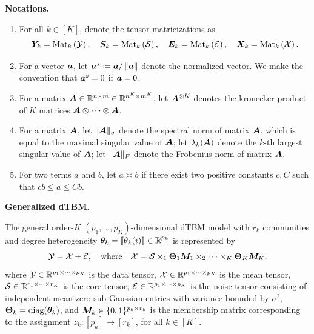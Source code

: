 \documentclass[lettersize,onecolumn,journal]{IEEEtran}
\theoremstyle{definition}
\theoremstyle{definition}
\newcommand{\of}[1]{\left(#1\right)}
\begin{document}
{\bf Notations.}
\begin{enumerate}
    \item For all $ k \in [K]$, denote the tensor matricizations as
    \begin{equation}
        \mY_k = \mat_k \of{ \tY }, \quad \mS_k = \mat_k \of{\tS}, \quad \mE_k = \mat_k \of{ \tE}, \quad \mX_k = \mat_k \of{\tX}.
    \end{equation}
    \item For a vector $\bm{a}$, let $\bm{a}^{s} \coloneqq \bm{a}/\left\lVert\bm{a}\right\rVert$ denote the normalized vector. We make the convention that $\bm{a}^s = 0$ if $\bm{a} = 0$. 
    \item For a matrix $\bm A \in \mathbb{R}^{n \times m} \in \mathbb{R}^{n^K \times m^K}$, let $\bm A^{\otimes K}$ denotes the kronecker product of $K$ matrices $\bm A \otimes \cdots \otimes \bm A$,
    \item For a matrix $\bm A$, let $\lVert\bm A\rVert_\sigma$ denote the spectral norm of matrix $\bm A$, which is equal to the maximal singular value of $\bm A$; let $\lambda_k(\bm A)$ denote the $k$-th largest singular value of $\bm A$; let $\lVert\bm A\rVert_F$ denote the Frobenius norm of matrix $\bm A$.
    \item For two terms $a$ and $b$, let $a \asymp b$ if there exist two positive constants $c, C$ such that $cb \leq a\leq Cb$. 
\end{enumerate}


{\bf Generalized dTBM.} 
 
 The general order-$K$ $(p_1, \ldots, p_K)$-dimensional dTBM model with $r_k$ communities and degree heterogeneity $\boldsymbol{\theta}_k = \llbracket \theta_k(i) \rrbracket \in \mathbb{R}_+^{p_k}$ is represented by
\begin{equation}\label{eq:general_dtbm}
    \tY = \tX+ \tE,\quad \text{where}\quad \tX=\tS \times_1 \mTheta_1 \mM_1 \times_2 \cdots \times_K \mTheta_K \mM_K,
\end{equation}
where $\mathcal{Y} \in \mathbb{R}^{p_1 \times \cdots \times p_K}$ is the data tensor, $\mathcal{X}\in \mathbb{R}^{p_1\times \cdots \times p_K}$ is the mean tensor, $\mathcal{S} \in \mathbb{R}^{r_1 \times \cdots \times r_K}$ is the core tensor, $\mathcal{E} \in \mathbb{R}^{p_1 \times \cdots \times p_K}$ is the noise tensor consisting of independent mean-zero sub-Gaussian entries with variance bounded by $\sigma^2$, $\boldsymbol{\Theta}_k = \text{diag}(\boldsymbol{\theta}_k)$, and $\bm M_k\in \{0,1\}^{p_k \times r_k}$ is the membership matrix corresponding to the assignment $z_k: [p_k] \mapsto [r_k]$, for all $k \in [K]$. 
\end{document}
